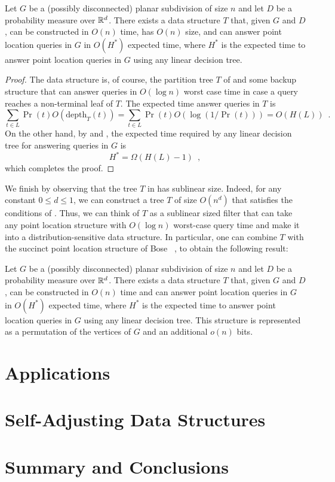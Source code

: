\documentclass{patmorin}
\newcommand{\depth}{\mathrm{depth}}
\begin{document}
\begin{thm}
  Let $G$ be a (possibly disconnected) planar subdivision of size $n$
  and let $D$ be a probability measure over $\mathbb{R}^d$.  There exists a data
  structure $T$ that, given $G$ and $D$, can be constructed in $O(n)$
  time, has $O(n)$ size, and can answer point location queries in $G$
  in $O(H^*)$ expected time, where $H^*$ is the expected time to answer
  point location queries in $G$ using any linear decision tree.
\end{thm}

\begin{proof}
  The data structure is, of course, the partition tree $T$ of
   and some backup structure that can answer
  queries in $O(\log n)$ worst case time in case a query reaches a
  non-terminal leaf of $T$.  The expected time answer queries in $T$ is
  \[
     \sum_{t\in L} \Pr(t)O(\depth_T(t)) = \sum_{t\in L}\Pr(t)O(\log(1/\Pr(t))) = O(H(L)) \enspace .
  \]
  On the other hand, by  and ,
  the expected time required by any linear decision tree for answering
  queries in $G$ is
  \[
      H^* = \Omega(H(L) - 1) \enspace ,
  \]
  which completes the proof.
\end{proof}

We finish by observing that the tree $T$ in 
has sublinear size. Indeed, for any constant $0 \le d \le 1$, we can
construct a tree $T$ of size $O(n^d)$ that satisfies the conditions
of .  Thus, we can think of $T$ as a sublinear
sized filter that can take any point location structure with $O(\log n)$
worst-case query time and make it into a distribution-sensitive data
structure.  In particular, one can combine $T$ with the succinct point
location structure of Bose \etal\ \cite[Theorem~2]{bchmm09}, to obtain the
following result:

\begin{thm}
  Let $G$ be a (possibly disconnected) planar subdivision of size $n$
  and let $D$ be a probability measure over $\mathbb{R}^d$.  There exists a data
  structure $T$ that, given $G$ and $D$, can be constructed in $O(n)$
  time and can answer point location queries in $G$ in $O(H^*)$ expected
  time, where $H^*$ is the expected time to answer point location queries
  in $G$ using any linear decision tree.  This structure is represented
  as a permutation of the vertices of $G$ and an additional $o(n)$ bits.
\end{thm}

\section{Applications}

\section{Self-Adjusting Data Structures}

\section{Summary and Conclusions}





\end{document}
